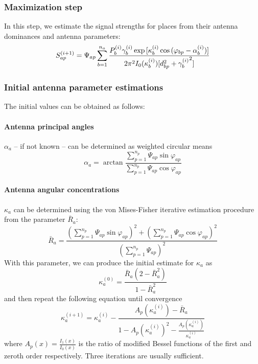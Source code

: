 \documentclass[a4paper]{article}
\begin{document}
\subsubsection{Maximization step}
In this step, we estimate the signal strengths for places from their antenna
dominances and antenna parameters:
\begin{equation}
S_{ap}^{(i+1)} = \Psi_{ap} \sum_{b=1}^{n_a} \frac
    {P_b^{(i)} \gamma_b^{(i)} \exp{[
        \kappa_b^{(i)} \cos{(\varphi_{bp} - \alpha_b^{(i)})}
    ]}}
    {2\pi^2 I_0(\kappa_b^{(i)}) [d_{bp}^2 + {\gamma_b^{(i)}}^2]}\\
\end{equation}

\subsubsection{Initial antenna parameter estimations}
The initial values can be obtained as follows:

\paragraph{Antenna principal angles} $\alpha_a$ -- if not known -- can be
determined as weighted circular means
\begin{equation}
\alpha_a = \arctan \frac
    {\sum_{p=1}^{n_p} \Psi_{ap} \sin \varphi_{ap}}
    {\sum_{p=1}^{n_p} \Psi_{ap} \cos \varphi_{ap}}
\end{equation}

\paragraph{Antenna angular concentrations} $\kappa_a$ can be determined
using the von Mises-Fisher iterative estimation procedure from the parameter
$\bar{R}_a$:
\begin{equation}
\bar{R}_a = \frac
    {\left(\sum_{p=1}^{n_p} \Psi_{ap} \sin \varphi_{ap}\right)^2
        + \left(\sum_{p=1}^{n_p} \Psi_{ap} \cos \varphi_{ap}\right)^2}
    {\left(\sum_{p=1}^{n_p} \Psi_{ap}\right)^2}
\end{equation}
With this parameter, we can produce the initial estimate for $\kappa_a$ as
\begin{equation}
\kappa_a^{(0)} = \frac
    {\bar{R}_a (2 - \bar{R}_a^2)}
    {1 - \bar{R}_a^2}
\end{equation}
and then repeat the following equation until convergence
\begin{equation}
\kappa_a^{(i+1)} = \kappa_a^{(i)} - \frac
    {A_p(\kappa_a^{(i)}) - \bar{R}_a}
    {1 - A_p(\kappa_a^{(i)})^2 - \frac{A_p(\kappa_a^{(i)})}{\kappa_a^{(i)}}}
\end{equation}
where $A_p(x) = \frac{I_1(x)}{I_0(x)}$ is the ratio of modified Bessel functions
of the first and zeroth order respectively. Three iterations are usually
sufficient.
\end{document}
